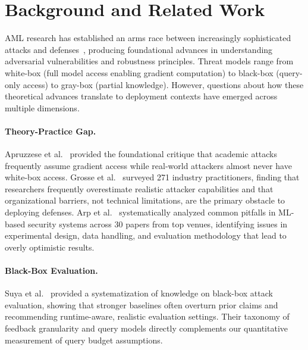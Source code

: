 \documentclass[runningheads]{llncs}
\begin{document}
\section{Background and Related Work}
\label{sec:background}

AML research has established an arms race between increasingly sophisticated attacks and defenses~\cite{carlini2019evaluating,tramer2020adaptive}, producing foundational advances in understanding adversarial vulnerabilities and robustness principles. Threat models range from white-box (full model access enabling gradient computation) to black-box (query-only access) to gray-box (partial knowledge). However, questions about how these theoretical advances translate to deployment contexts have emerged across multiple dimensions.

\paragraph{Theory-Practice Gap.} Apruzzese et al.~\cite{apruzzese2022real} provided the foundational critique that academic attacks frequently assume gradient access while real-world attackers almost never have white-box access. Grosse et al.~\cite{grosse2024practical} surveyed 271 industry practitioners, finding that researchers frequently overestimate realistic attacker capabilities and that organizational barriers, not technical limitations, are the primary obstacle to deploying defenses. Arp et al.~\cite{arp2022dos} systematically analyzed common pitfalls in ML-based security systems across 30 papers from top venues, identifying issues in experimental design, data handling, and evaluation methodology that lead to overly optimistic results.

\paragraph{Black-Box Evaluation.} Suya et al.~\cite{suya2024sok} provided a systematization of knowledge on black-box attack evaluation, showing that stronger baselines often overturn prior claims and recommending runtime-aware, realistic evaluation settings. Their taxonomy of feedback granularity and query models directly complements our quantitative measurement of query budget assumptions.
\end{document}
